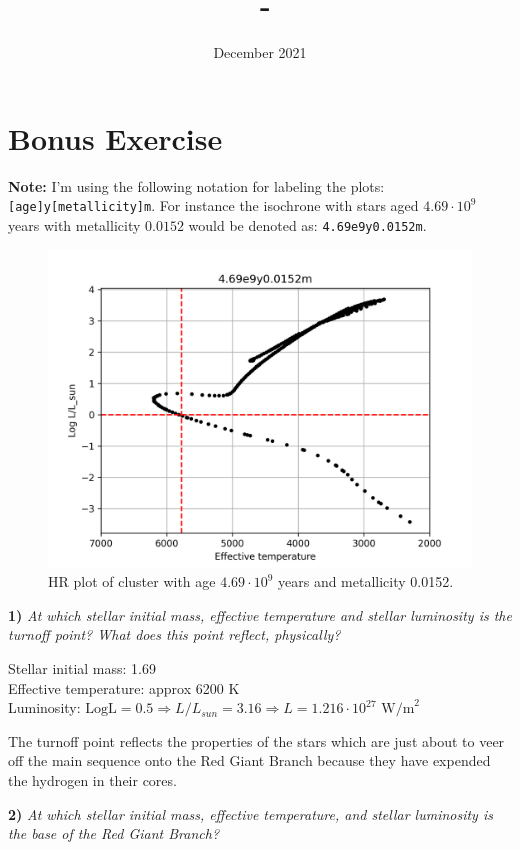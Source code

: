\documentclass[11pt,a4paper]{article}
\date{December 2021} %
\title{\Foursename\, -\, \Fassignment}
\author{\Fauthor}
\newcommand{\Fassignment}{Bonus Exercise} %
\begin{document}
    
    \clearpage
    \section*{\Fassignment}

    \textbf{Note:} I'm using the following notation for labeling the plots: \texttt{[age]y[metallicity]m}.
    For instance the isochrone with stars aged $4.69 \cdot 10^9$ years with metallicity $0.0152$ would be denoted as: \texttt{4.69e9y0.0152m}.

    \begin{figure}[h]
        \centering
        \includegraphics[width=12cm]{figures/4.69e9y0.0152m}
        \caption{HR plot of cluster with age $4.69 \cdot 10^{9}$ years and metallicity 0.0152.}
        \label{fig:ogHR}
    \end{figure}

    \textbf{1)} \textit{At which stellar initial mass, effective temperature and stellar luminosity is the turnoff point? What does this point reflect, physically?}

    Stellar initial mass: 1.69\\
    Effective temperature: approx 6200 K\\
    Luminosity: $\textrm{LogL} = 0.5 \Rightarrow L/L_{sun} = 3.16 \Rightarrow L = 1.216 \cdot 10^{27} \textrm{ W/m}^2$

    The turnoff point reflects the properties of the stars which are just about to veer off the main sequence onto the Red Giant Branch because they have expended the hydrogen in their cores.

    \textbf{2)} \textit{At which stellar initial mass, effective temperature, and stellar luminosity is the base of the Red Giant Branch?}
\end{document}
